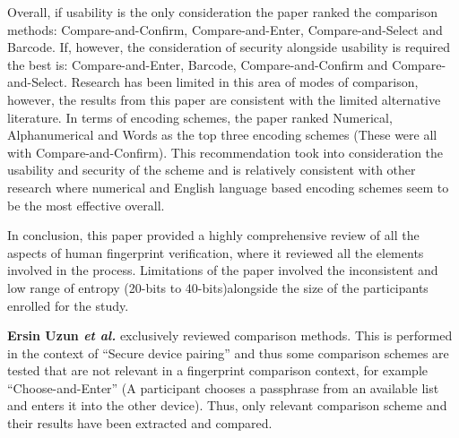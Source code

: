 Overall, if usability is the only consideration the paper ranked the comparison methods: Compare-and-Confirm, Compare-and-Enter, Compare-and-Select and Barcode. If, however, the consideration of security alongside usability is required the best is: Compare-and-Enter, Barcode, Compare-and-Confirm and Compare-and-Select. Research has been limited in this area of modes of comparison, however, the results from this paper are consistent with the limited alternative literature. In terms of encoding schemes, the paper ranked Numerical, Alphanumerical and Words as the top three encoding schemes (These were all with Compare-and-Confirm). This recommendation took into consideration the usability and security of the scheme and is relatively consistent with other research where numerical and English language based encoding schemes seem to be the most effective overall.

In conclusion, this paper provided a highly comprehensive review of all the aspects of human fingerprint verification, where it reviewed all the elements involved in the process. Limitations of the paper involved the inconsistent and low range of entropy (20-bits to 40-bits)alongside the size of the participants enrolled for the study.

\textbf{Ersin Uzun \textit{et al.}}\cite{uzun2007usability} exclusively reviewed comparison methods. This is performed in the context of ``Secure device pairing'' and thus some comparison schemes are tested that are not relevant in a fingerprint comparison context, for example  ``Choose-and-Enter'' (A participant chooses a passphrase from an available list and enters it into the other device). Thus, only relevant comparison scheme and their results have been extracted and compared. 

